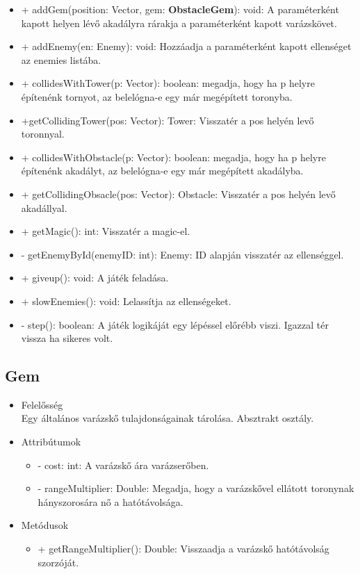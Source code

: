 \begin{itemize}
\begin{itemize}
		\item + addGem(position: Vector, gem: \textbf{ObstacleGem}): void: A paraméterként kapott helyen lévő akadályra rárakja a paraméterként kapott varázskövet.
		\item + addEnemy(en: Enemy): void: Hozzáadja a paraméterként kapott ellenséget az enemies listába.
		\item + collidesWithTower(p: Vector): boolean: megadja, hogy ha p helyre építenénk tornyot, az belelógna-e egy már megépített toronyba.
		\item +getCollidingTower(pos: Vector): Tower: Visszatér a pos helyén levő toronnyal.
		\item + collidesWithObstacle(p: Vector): boolean: megadja, hogy ha p helyre építenénk akadályt, az belelógna-e egy már megépített akadályba.
		\item + getCollidingObsacle(pos: Vector): Obstacle: Visszatér a pos helyén levő akadállyal.
		\item + getMagic(): int: Visszatér a magic-el.
		\item - getEnemyById(enemyID: int): Enemy: ID alapján visszatér az ellenséggel.
		\item + giveup(): void: A játék feladása.
		\item + slowEnemies(): void: Lelassítja az ellenségeket.
		\item - step(): boolean: A játék logikáját egy lépéssel előrébb viszi. Igazzal tér vissza ha sikeres volt.
	\end{itemize}
\end{itemize}

\subsection{Gem}
\begin{itemize}
\item Felelősség\\
Egy általános varázskő tulajdonságainak tárolása. Absztrakt osztály.
\item Attribútumok
	\begin{itemize}
		\item - cost: int: A varázskő ára varázserőben.
		\item - rangeMultiplier: Double: Megadja, hogy a varázskővel ellátott toronynak hányszorosára nő a hatótávolsága.
	\end{itemize}
\item Metódusok
	\begin{itemize}
		\item + getRangeMultiplier(): Double: Visszaadja a varázskő hatótávolság szorzóját.
	\end{itemize}
\end{itemize}

